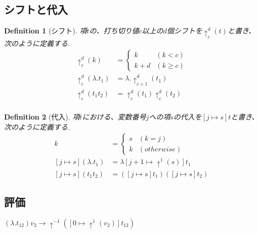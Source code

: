 \documentclass[a4paper,10pt]{article}
\newtheorem{definition}{Definition}[section]
\begin{document}
\subsection*{シフトと代入}
\begin{definition}[シフト]
    項$t$の、打ち切り値$c$以上の$d$個シフトを$\uparrow_{c}^d(t)$と書き、次のように定義する.
    \begin{align*}
        \uparrow_{c}^d(k) &=
        \begin{cases}
            k & (k < c)\\
            k + d & (k \geq c)
        \end{cases}\\
        \uparrow_{c}^d (\lambda. t_1) &= \lambda. \uparrow_{c+1}^d(t_1)\\
        \uparrow_{c}^d (t_1 t_2) &= \uparrow_{c}^d (t_1) \uparrow_c^d(t_2)\\
    \end{align*}
\end{definition}
\begin{definition}[代入]
    項$t$における、変数番号$j$への項$s$の代入を$[j \mapsto s]t$と書き、次のように定義する.
    \begin{align*}
        [j \mapsto s]k &=
        \begin{cases}
            s & (k = j)\\
            k & (otherwise)
        \end{cases}\\
        [j \mapsto s](\lambda. t_1) &= \lambda [j + 1 \mapsto \uparrow^1(s)]t_1\\
        [j \mapsto s](t_1 t_2) &= ([j \mapsto s] t_1)([j \mapsto s] t_2)
    \end{align*}
\end{definition}
\subsection*{評価}
$(\lambda. t_{12}) v_2 \rightarrow \uparrow^{-1}([0 \mapsto \uparrow^{1}(v_2)]t_{12})$
\end{document}
